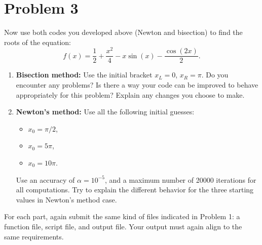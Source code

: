 \section{Problem 3}%
\label{sec:problem_3}
Now use both codes you developed above (Newton and bisection) to find the roots of the equation:
\begin{equation*}
  f(x) = \frac{1}{2} + \frac{x^{2}}{4} - x \sin(x) - \frac{\cos(2x)}{2}.
\end{equation*}
\begin{enumerate}
  \item \textbf{Bisection method:} Use the initial bracket $x_{L} = 0$, $x_{R} = \pi$. Do you encounter any problems? Is there a way your code can be improved to behave appropriately for this problem? Explain any changes you choose to make.
  \item \textbf{Newton's method:} Use all the following initial guesses:
    \begin{itemize}
      \item $x_{0} = \pi / 2$,
      \item $x_{0} = 5 \pi$,
      \item $x_{0} = 10 \pi$.
    \end{itemize}
    Use an accuracy of $\alpha = 10^{-5}$, and a maximum number of 20000 iterations for all computations. Try to explain the different behavior for the three starting values in Newton's method case.
\end{enumerate}
For each part, again submit the same kind of files indicated in Problem 1: a function file, script file, and output file. Your output must again align to the same requirements.
